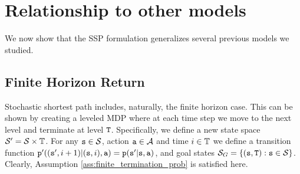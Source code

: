 





\section{Relationship to other models}

We now show that the SSP formulation generalizes several previous models we studied.

\subsection{Finite Horizon Return}
Stochastic shortest path includes, naturally, the finite horizon case. 
This can be shown by creating a leveled MDP where at each time step we move to the next level and terminate at level ${\tt T}$.
Specifically, we define a new state space $\mathcal{S}'=\mathcal{S}\times \mathbb{T}$.
For any ${\tt s}\in\mathcal{S}$, action ${\tt a}\in\mathcal{A}$ and time 
$i\in \mathbb{T}$  we define a transition function 
${\tt p}' (({\tt s}',i+1)|({\tt s},i),{\tt a})={\tt p}({\tt s}'|{\tt s},{\tt a})$, 
and goal states $\mathcal{S}_G=\{({\tt s},{\tt T}):{\tt s} \in\mathcal{S}\}$.
Clearly, Assumption \ref{ass:finite_termination_prob} is satisfied here.

